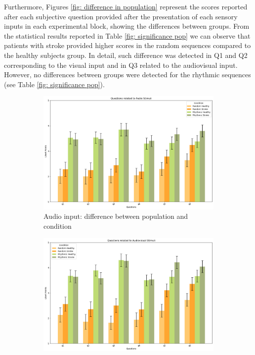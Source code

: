 Furthermore, Figures \ref{fig: difference in population} represent the scores reported after each subjective question provided after the presentation of each sensory inputs in each experimental block, showing the differences between groups. From the statistical results reported in Table \ref{fig: significance pop} we can observe that patients with stroke provided higher scores in the random sequences compared to the healthy subjects group. In detail, such difference was detected in Q1 and Q2 corresponding to the visual input and in Q3 related to the audiovisual input. However, no differences between groups were detected for the rhythmic sequences (see Table \ref{fig: significance pop}).
\begin{figure}[htbp]
    \begin{subfigure}[htbp]{0.5\textwidth}
        \centering
        \includegraphics[width=\textwidth]{bar_plots/plot_pop_adio.png}
        \caption{Audio input: difference between population and condition}
        \label{fig: bar_visual_pop} 
    \end{subfigure} 
    \begin{subfigure}[htbp]{0.5\textwidth}
        \centering
        \includegraphics[width=\textwidth]{bar_plots/plot_pop_audiovisual.png}

\end{subfigure}
\end{figure}
